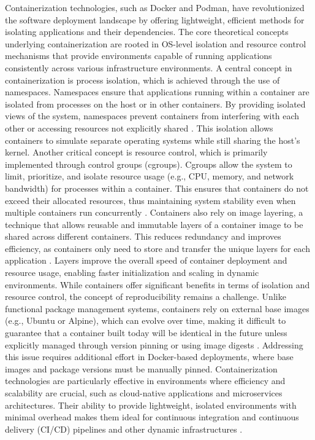 Containerization technologies, such as Docker and Podman, have revolutionized
the software deployment landscape by offering lightweight, efficient methods
for isolating applications and their dependencies. The core theoretical
concepts underlying containerization are rooted in OS-level isolation and
resource control mechanisms that provide environments capable of running
applications consistently across various infrastructure environments.
A central concept in containerization is process isolation, which is
achieved through the use of namespaces. Namespaces ensure that
applications running within a container are isolated from processes on the
host or in other containers. By providing isolated views of the system,
namespaces prevent containers from interfering with each other or accessing
resources not explicitly shared \cite{Cgroups2024}. This isolation allows
containers to simulate separate operating systems while still sharing the
host's kernel.
Another critical concept is resource control, which is primarily
implemented through control groups (cgroups). Cgroups allow
the system to limit, prioritize, and isolate resource usage (e.g., CPU, memory,
and network bandwidth) for processes within a container. This ensures that
containers do not exceed their allocated resources, thus maintaining system
stability even when multiple containers run concurrently
\cite[Under the Hood]{merkelDockerLightweightLinux2014}.
Containers also rely on image layering, a technique that allows
reusable and immutable layers of a container image to be shared across
different containers. This reduces redundancy and improves efficiency, as
containers only need to store and transfer the unique layers for each
application \cite[Chapter 2.4]{merkelDockerLightweightLinux2014}. Layers
improve the overall speed of container deployment and resource usage,
enabling faster initialization and scaling in dynamic environments.
While containers offer significant benefits in terms of isolation and resource
control, the concept of reproducibility remains a challenge. Unlike
functional package management systems, containers rely on external base images
(e.g., Ubuntu or Alpine), which can evolve over time, making it difficult to
guarantee that a container built today will be identical in the future unless
explicitly managed through version pinning or using image digests
\cite{InotifySharedDrives}. Addressing this issue requires additional
effort in Docker-based deployments, where base images and package versions
must be manually pinned.
Containerization technologies are particularly effective in environments
where efficiency and scalability are crucial, such as
cloud-native applications and microservices architectures. Their ability
to provide lightweight, isolated environments with minimal overhead makes
them ideal for continuous integration and continuous delivery (CI/CD)
pipelines and other dynamic infrastructures \cite{Cgroups2024}.

